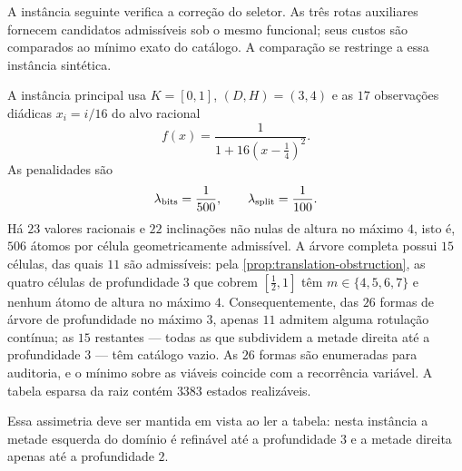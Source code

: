 \documentclass[11pt,a4paper]{article}
\theoremstyle{definition}
\theoremstyle{remark}
\begin{document}
A instância seguinte verifica a correção do seletor. As três rotas auxiliares fornecem candidatos admissíveis sob o mesmo funcional; seus custos são comparados ao mínimo exato do catálogo. A comparação se restringe a essa instância sintética.

A instância principal usa $K=[0,1]$, $(D,H)=(3,4)$ e as $17$ observações
diádicas $x_i=i/16$ do alvo racional
\begin{equation}
 f(x)=\frac{1}{1+16(x-\tfrac14)^2}.
 \label{eq:experiment-target}
\end{equation}
As penalidades são
\[
 \lambda_{\rm bits}=\frac1{500},
 \qquad
 \lambda_{\rm split}=\frac1{100}.
\]
Há $23$ valores racionais e $22$ inclinações não nulas de altura no máximo
$4$, isto é, $506$ átomos por célula geometricamente admissível. A árvore
completa possui $15$ células, das quais $11$ são admissíveis: pela
\cref{prop:translation-obstruction}, as quatro células de profundidade $3$ que
cobrem $[\tfrac12,1]$ têm $m\in\{4,5,6,7\}$ e nenhum átomo de altura no
máximo $4$. Consequentemente, das $26$ formas de árvore de profundidade no
máximo $3$, apenas $11$ admitem alguma rotulação contínua; as $15$ restantes
--- todas as que subdividem a metade direita até a profundidade $3$ --- têm
catálogo vazio. As $26$ formas são enumeradas para auditoria, e o mínimo sobre
as viáveis coincide com a recorrência variável. A tabela esparsa da raiz
contém $3383$ estados realizáveis.

Essa assimetria deve ser mantida em vista ao ler a tabela: nesta instância a
metade esquerda do domínio é refinável até a profundidade $3$ e a metade
direita apenas até a profundidade $2$.
\end{document}
